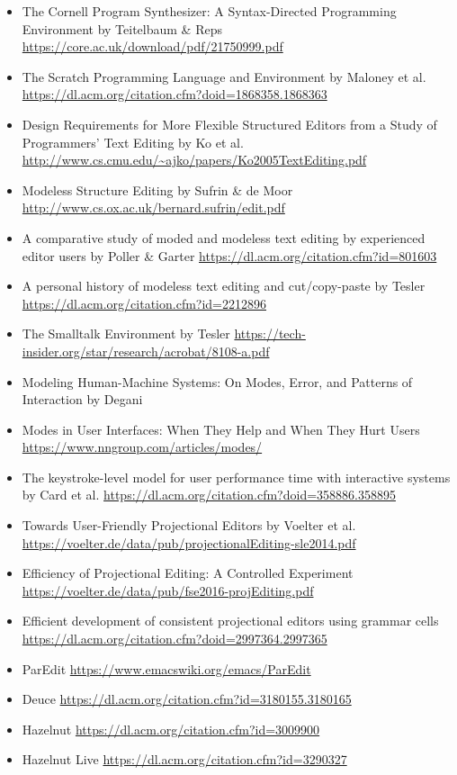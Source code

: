 \documentclass[runningheads]{llncs}
\begin{document}
\begin{itemize}
\item The Cornell Program Synthesizer: A Syntax-Directed Programming Environment by Teitelbaum \& Reps \url{https://core.ac.uk/download/pdf/21750999.pdf}
\item The Scratch Programming Language and Environment by Maloney et al. \url{https://dl.acm.org/citation.cfm?doid=1868358.1868363}
\item Design Requirements for More Flexible Structured Editors from a Study of Programmers' Text Editing by Ko et al. \url{http://www.cs.cmu.edu/~ajko/papers/Ko2005TextEditing.pdf}
\item Modeless Structure Editing by Sufrin \& de Moor \url{http://www.cs.ox.ac.uk/bernard.sufrin/edit.pdf}
\item A comparative study of moded and modeless text editing by experienced editor users by Poller \& Garter \url{https://dl.acm.org/citation.cfm?id=801603}
\item A personal history of modeless text editing and cut/copy-paste by Tesler \url{https://dl.acm.org/citation.cfm?id=2212896}
\item The Smalltalk Environment by Tesler \url{https://tech-insider.org/star/research/acrobat/8108-a.pdf}
\item Modeling Human-Machine Systems: On Modes, Error, and Patterns of Interaction by Degani %
\item Modes in User Interfaces: When They Help and When They Hurt Users \url{https://www.nngroup.com/articles/modes/}
\item The keystroke-level model for user performance time with interactive systems by Card et al. \url{https://dl.acm.org/citation.cfm?doid=358886.358895}
\item Towards User-Friendly Projectional Editors by Voelter et al. \url{https://voelter.de/data/pub/projectionalEditing-sle2014.pdf}
\item Efficiency of Projectional Editing: A Controlled Experiment \url{https://voelter.de/data/pub/fse2016-projEditing.pdf}
\item Efficient development of consistent projectional editors using grammar cells \url{https://dl.acm.org/citation.cfm?doid=2997364.2997365}
\item ParEdit \url{https://www.emacswiki.org/emacs/ParEdit}

\item Deuce \url{https://dl.acm.org/citation.cfm?id=3180155.3180165}
\item Hazelnut \url{https://dl.acm.org/citation.cfm?id=3009900}
\item Hazelnut Live \url{https://dl.acm.org/citation.cfm?id=3290327}
\end{itemize}
\end{document}
